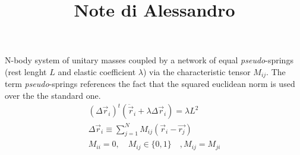

\usepackage[english]{babel}




\title{Note di Alessandro}



\begin{multicols}{3}
  \maketitle
  N-body system of unitary masses coupled by a network of equal \textit{pseudo}-springs (rest lenght $L$ and elastic coefficient $\lambda$) via the characteristic tensor $M_{ij}$.
  The term \textit{pseudo}-springs references the fact that the squared euclidean norm is used over the the standard one.
  \begin{equation}
    \label{eq:spring-network}
    \begin{gathered}
      (\Delta\vec{r}_i)^t\left(\ddot{\vec{r}}_i + \lambda\Delta\vec{r}_i\right) = \lambda L^2 \\
      \Delta\vec{r}_i \equiv \sum_{j=1}^NM_{ij}\left(\vec{r}_i - \vec{r_j}\right) \\
      M_{ii} = 0, \quad M_{ij} \in \{0, 1\} \quad, M_{ij} = M_{ji}
    \end{gathered}
  \end{equation}
\end{multicols}



